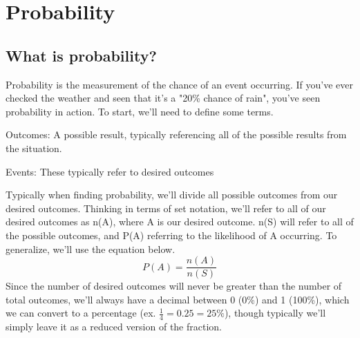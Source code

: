 \section{Probability}

    \subsection{What is probability?}
    Probability is the measurement of the chance of an event occurring.
    If you've ever checked the weather and seen that it's a "20\% chance of rain", you've seen probability in action.
    To start, we'll need to define some terms.
    \begin{definition}
        Outcomes: A possible result, typically referencing all of the possible results from the situation.
    \end{definition}
    \begin{definition}
        Events: These typically refer to desired outcomes
    \end{definition}
    Typically when finding probability, we'll divide all possible outcomes from our desired outcomes.
    Thinking in terms of set notation, we'll refer to all of our desired outcomes as n(A), where A is our desired outcome.
    n(S) will refer to all of the possible outcomes, and P(A) referring to the likelihood of A occurring.
    To generalize, we'll use the equation below.
    \begin{equation*}
        P(A) = \frac{n(A)}{n(S)}
    \end{equation*}
    Since the number of desired outcomes will never be greater than the number of total outcomes, we'll always have a decimal between 0 (0\%) and 1 (100\%), which we can convert to a percentage (ex. $\frac{1}{4}=0.25=25\%$), though typically we'll simply leave it as a reduced version of the fraction.
    
